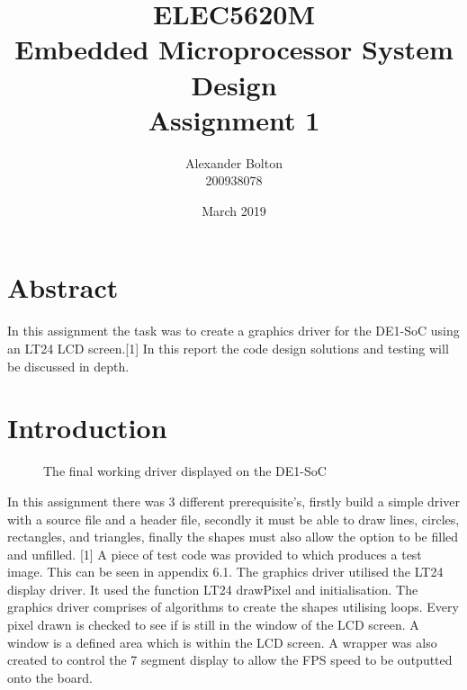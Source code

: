 \documentclass[a4paper,12pt]{article}
\begin{document}
\title{ELEC5620M \\ Embedded Microprocessor System Design \\ Assignment 1}
\author{Alexander Bolton \\ 200938078}
\date{March 2019}
\maketitle
\section{Abstract}
In this assignment the task was to create a graphics driver for the DE1-SoC using an LT24 LCD screen.[1] In this report the code design solutions and testing will be discussed in depth.  
\newpage

\tableofcontents
\newpage

\section{Introduction}
\begin{figure}[h]
	\centering
	\caption{The final working driver displayed on the DE1-SoC}
\end{figure}

\begin{flushleft}
In this assignment there was 3 different prerequisite's, firstly build a simple driver with a source file and a header file, secondly it must be able to draw lines, circles, rectangles, and triangles, finally the shapes must also allow the option to be filled and unfilled. [1] A piece of test code was provided to which produces a test image. This can be seen in appendix 6.1. 
\newline
\newline
The graphics driver utilised the LT24 display driver. It used the function LT24 drawPixel and initialisation. The graphics driver comprises of algorithms to create the shapes utilising loops. Every pixel drawn is checked to see if is still in the window of the LCD screen. A window is a defined area which is within the LCD screen. A wrapper was also created to control the 7 segment display to allow the FPS speed to be outputted onto the board.
\end{flushleft}
\end{document}
